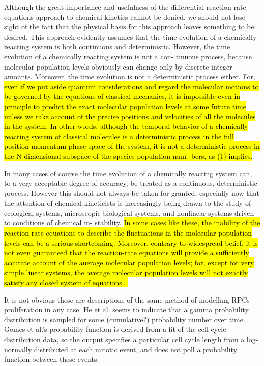 \documentclass{ut-thesis}
\begin{document}
\begin{longquote}Although the great importance and usefulness of the
differential reaction-rate equations approach to chemical
kinetics cannot be denied, we should not lose sight of the
fact that the physical basis for this approach leaves
something to be desired. This approach evidently assumes
that the time evolution of a chemically reacting system is
both continuous and deterministic. However, the time
evolution of a chemically reacting system is not a con-
tinuous process, because molecular population levels
obviously can change only by discrete integer amounts.
Moreover, the time evolution is not a deterministic process
either. For, \hl{even if we put aside quantum considerations
and regard the molecular motions to be governed by the
equations of classical mechanics, it is impossible even in
principle to predict the exact molecular population levels
at some future time unless we take account of the precise
positions and velocities of all the molecules in the system.
In other words, although the temporal behavior of a
chemically reacting system of classical molecules is a
deterministic process in the full position-momentum phase
space of the system, it is not a deterministic process in the
N-dimensional subspace of the species population num-
bers, as (1) implies.}

In many cases of course the time evolution of a
chemically reacting system can, to a very acceptable degree
of accuracy, be treated as a continuous, deterministic
process. However this should not always be taken for
granted, especially now that the attention of chemical
kineticists is increasingly being drawn to the study of
ecological systems, microscopic biological systems, and
nonlinear systems driven to conditions of chemical in-
stability. \hl{In some cases like these, the inability of the
reaction-rate equations to describe the fluctuations in the
molecular population levels can be a serious shortcoming.
Moreover, contrary to widespread belief, it is not even
guaranteed that the reaction-rate equations will provide
a sufficiently accurate account of the auerage molecular
population levels; for, except for very simple linear systems,
the average molecular population levels will not exactly
satisfy any closed system of equations...}
\end{longquote}

\bigskip


It is not obvious these are descriptions of the same method of modelling RPCs proliferation in any case. He et al. seems to indicate that a gamma probability distribution is sampled for some (cumulative?) probability number over time. Gomes et al.'s probability function is derived from a fit of the cell cycle distribution data, so the output specifies a particular cell cycle length from a log-normally distributed at each mitotic event, and does not poll a probability function between these events.
\end{document}
